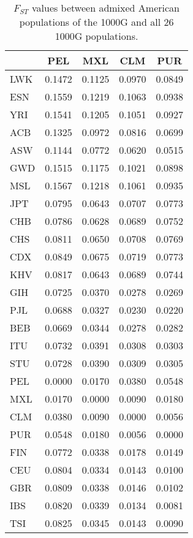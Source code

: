 \begin{table}[ht]
\centering
\caption{$F_{ST}$ values between admixed American populations of the 1000G and all 26 1000G populations.} 
\label{tab:fst-AMR}
\begin{tabular}{|l|c|c|c|c|}
  \hline
 & PEL & MXL & CLM & PUR \\ 
  \hline
LWK & 0.1472 & 0.1125 & 0.0970 & 0.0849 \\ 
  ESN & 0.1559 & 0.1219 & 0.1063 & 0.0938 \\ 
  YRI & 0.1541 & 0.1205 & 0.1051 & 0.0927 \\ 
  ACB & 0.1325 & 0.0972 & 0.0816 & 0.0699 \\ 
  ASW & 0.1144 & 0.0772 & 0.0620 & 0.0515 \\ 
  GWD & 0.1515 & 0.1175 & 0.1021 & 0.0898 \\ 
  MSL & 0.1567 & 0.1218 & 0.1061 & 0.0935 \\ 
   \hline
JPT & 0.0795 & 0.0643 & 0.0707 & 0.0773 \\ 
  CHB & 0.0786 & 0.0628 & 0.0689 & 0.0752 \\ 
  CHS & 0.0811 & 0.0650 & 0.0708 & 0.0769 \\ 
  CDX & 0.0849 & 0.0675 & 0.0719 & 0.0773 \\ 
  KHV & 0.0817 & 0.0643 & 0.0689 & 0.0744 \\ 
   \hline
GIH & 0.0725 & 0.0370 & 0.0278 & 0.0269 \\ 
  PJL & 0.0688 & 0.0327 & 0.0230 & 0.0220 \\ 
  BEB & 0.0669 & 0.0344 & 0.0278 & 0.0282 \\ 
  ITU & 0.0732 & 0.0391 & 0.0308 & 0.0303 \\ 
  STU & 0.0728 & 0.0390 & 0.0309 & 0.0305 \\ 
   \hline
PEL & 0.0000 & 0.0170 & 0.0380 & 0.0548 \\ 
  MXL & 0.0170 & 0.0000 & 0.0090 & 0.0180 \\ 
  CLM & 0.0380 & 0.0090 & 0.0000 & 0.0056 \\ 
  PUR & 0.0548 & 0.0180 & 0.0056 & 0.0000 \\ 
   \hline
FIN & 0.0772 & 0.0338 & 0.0178 & 0.0149 \\ 
  CEU & 0.0804 & 0.0334 & 0.0143 & 0.0100 \\ 
  GBR & 0.0809 & 0.0338 & 0.0146 & 0.0102 \\ 
  IBS & 0.0820 & 0.0339 & 0.0134 & 0.0081 \\ 
  TSI & 0.0825 & 0.0345 & 0.0143 & 0.0090 \\ 
   \hline
\end{tabular}
\end{table}
